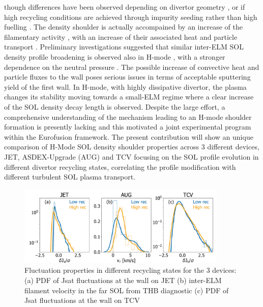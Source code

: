\documentclass[12pt, a4paper, twoside]{article}
\begin{document}
though differences have been observed depending on divertor geometry
\cite{Wynn:2018gp}, or if high recycling conditions are achieved
through impurity seeding rather than high fuelling
\cite{Wynn:2018gp,Kuang:2019248}.
The density shoulder is actually accompained by
an increase of the filamentary activity
\cite{Carralero:2017gb,vianello:nf2019}, with an increase of
their associated heat and particle transport \cite{Carralero:2017gb}.
Preliminary investigations suggested that similar inter-ELM SOL
density profile broadening is observed also in H-mode
\cite{Muller:2015jt,Carralero:2017gb,vianello:nf2019}, with a stronger
dependence on the neutral pressure \cite{vianello:nf2019}. The
possible increase of convective heat and particle fluxes to the wall
poses serious issues in terms of acceptable sputtering yield of the
first wall. In H-mode,
with highly dissipative divertor, the
plasma changes its stability moving towards a small-ELM
regime \cite{Harrer:2018jn} where a clear increase of
the SOL density decay length is observed.
Despite the
large effort, a comprehensive understanding
of the mechanism leading to an H-mode shoulder formation is presently
lacking and this motivated a joint experimental program within the
Eurofusion framework.
The present contribution will show an unique comparison of H-Mode SOL
density shoulder properties across 3 different devices, JET, ASDEX-Upgrade (AUG) and
TCV focusing on the SOL profile evolution in different divertor recycling
states, correlating the profile modification with different turbulent SOL
plasma transport.
\begin{figure}
\includegraphics[width=100mm]{../pdfbox/SynopsisFluctuationCombined.pdf}
\caption{Fluctuation properties in different recycling states for the
  3 devices:(a) PDF of Jsat fluctuations at the wall on JET (b)
  inter-ELM filament velocity in the far SOL from THB diagnostic (c) PDF of Jsat fluctuations at the wall on TCV}
\vspace{-2.6ex}
\label{fig:figFluctuations}
\end{figure}
\end{document}
